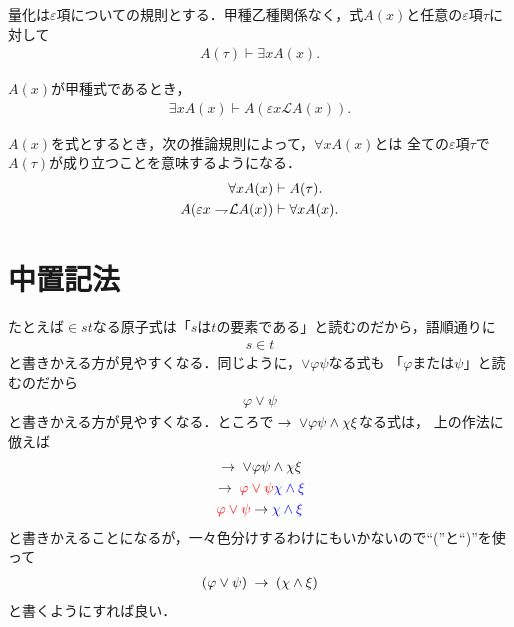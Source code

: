 	量化は$\varepsilon$項についての規則とする．甲種乙種関係なく，式$A(x)$と任意の$\varepsilon$項$\tau$に対して
	\begin{align}
		A(\tau) \vdash \exists x A(x).
	\end{align}
	
	$A(x)$が甲種式であるとき，
	\begin{align}
		\exists x A(x) \vdash A\left(\varepsilon x \mathcal{L}A(x)\right).
	\end{align}
	
	$A(x)$を式とするとき，次の推論規則によって，$\forall x A(x)$とは
	全ての$\varepsilon$項$\tau$で$A(\tau)$が成り立つことを意味するようになる．
	\begin{align}
		\forall x A(x) &\vdash A(\tau). \\
		A(\varepsilon x \rightharpoondown\hspace{-0.25em} \mathcal{L}A(x)) &\vdash \forall x A(x). 
	\end{align}
	
\section{中置記法}
	たとえば$\in s t$なる原子式は「$s$は$t$の要素である」と読むのだから，語順通りに
	\begin{align}
		s \in t
	\end{align}
	と書きかえる方が見やすくなる．同じように，$\vee \varphi \psi$なる式も
	「$\varphi$または$\psi$」と読むのだから
	\begin{align}
		\varphi \vee \psi
	\end{align}
	と書きかえる方が見やすくなる．ところで$\hspace{0.25em}\rightarrow\hspace{0.25em} \vee \varphi \psi \wedge \chi \xi$なる式は，
	上の作法に倣えば
	\begin{align}
		\begin{gathered}
			\hspace{0.25em}\rightarrow\hspace{0.25em} \vee \varphi \psi \wedge \chi \xi \\
			\hspace{0.25em}\rightarrow\hspace{0.25em} \color{red}{\varphi \vee \psi} \color{blue}{\chi \wedge \xi} \\
			\color{red}{\varphi \vee \psi} \color{black}{\hspace{0.25em}\rightarrow\hspace{0.25em}} \color{blue}{\chi \wedge \xi}
		\end{gathered}
	\end{align}
	と書きかえることになるが，一々色分けするわけにもいかないので``(''と``)''を使って
	\begin{align}
		(\varphi \vee \psi) \hspace{0.25em}\rightarrow\hspace{0.25em} (\chi \wedge \xi)
	\end{align}
	と書くようにすれば良い．
	
